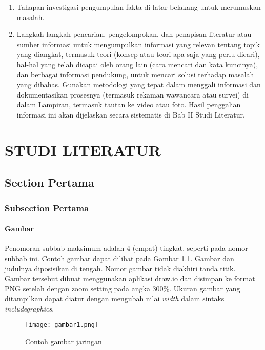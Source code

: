 \documentclass[12pt,a4paper,oneside]{book}
\begin{document}
\begin{enumerate}
\item	Tahapan investigasi pengumpulan fakta di latar belakang untuk merumuskan masalah.
\item	Langkah-langkah pencarian, pengelompokan, dan penapisan literatur atau sumber informasi untuk mengumpulkan informasi yang relevan tentang topik yang diangkat, termasuk teori (konsep atau teori apa saja yang perlu dicari), hal-hal yang telah dicapai oleh orang lain (cara mencari dan kata kuncinya), dan berbagai informasi pendukung, untuk mencari solusi terhadap masalah yang dibahas. Gunakan metodologi yang tepat dalam menggali informasi dan dokumentasikan prosesnya (termasuk rekaman wawancara atau survei) di dalam Lampiran, termasuk tautan ke video atau foto. Hasil penggalian informasi ini akan dijelaskan secara sistematis di Bab II Studi Literatur.
\end{enumerate}

\chapter{STUDI LITERATUR}
\section{Section Pertama}
\lipsum[1]
\subsection{Subsection Pertama}
\lipsum[2]
\subsubsection{Gambar}
Penomoran subbab maksimum adalah 4 (empat) tingkat, seperti pada nomor subbab ini. Contoh gambar dapat dilihat pada Gambar \ref{gambar:jaringan}. Gambar dan judulnya diposisikan di tengah. Nomor gambar tidak diakhiri tanda titik. Gambar tersebut dibuat menggunakan aplikasi draw.io dan disimpan ke format PNG setelah dengan zoom setting pada angka 300\%. Ukuran gambar yang ditampilkan dapat diatur dengan mengubah nilai \textit{width} dalam sintaks \textit{includegraphics}.

\begin{figure}[t] %
	\centering
    	\texttt{[image: gambar1.png]}
	\caption{Contoh gambar jaringan}
	\label{gambar:jaringan}
\end{figure}
\end{document}
